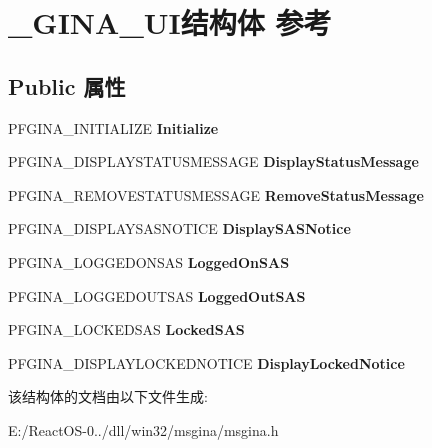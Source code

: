 \hypertarget{struct___g_i_n_a___u_i}{}\section{\+\_\+\+G\+I\+N\+A\+\_\+\+U\+I结构体 参考}
\label{struct___g_i_n_a___u_i}
\subsection*{Public 属性}
\begin{DoxyCompactItemize}
\item 
\mbox{\label{struct___g_i_n_a___u_i_afdce3f71422f5eb54759e1675a76614f}} 
P\+F\+G\+I\+N\+A\+\_\+\+I\+N\+I\+T\+I\+A\+L\+I\+ZE {\bfseries Initialize}
\item 
\mbox{\label{struct___g_i_n_a___u_i_af6692d32eae7412cc06bd110613986ea}} 
P\+F\+G\+I\+N\+A\+\_\+\+D\+I\+S\+P\+L\+A\+Y\+S\+T\+A\+T\+U\+S\+M\+E\+S\+S\+A\+GE {\bfseries Display\+Status\+Message}
\item 
\mbox{\label{struct___g_i_n_a___u_i_ae9ac1347b6acd2fb6b726751b46bf8e6}} 
P\+F\+G\+I\+N\+A\+\_\+\+R\+E\+M\+O\+V\+E\+S\+T\+A\+T\+U\+S\+M\+E\+S\+S\+A\+GE {\bfseries Remove\+Status\+Message}
\item 
\mbox{\label{struct___g_i_n_a___u_i_a6fe8a09b6459a2d148f222a5752d0bf3}} 
P\+F\+G\+I\+N\+A\+\_\+\+D\+I\+S\+P\+L\+A\+Y\+S\+A\+S\+N\+O\+T\+I\+CE {\bfseries Display\+S\+A\+S\+Notice}
\item 
\mbox{\label{struct___g_i_n_a___u_i_ab67f938fa456e3b6f5ff303c073e9271}} 
P\+F\+G\+I\+N\+A\+\_\+\+L\+O\+G\+G\+E\+D\+O\+N\+S\+AS {\bfseries Logged\+On\+S\+AS}
\item 
\mbox{\label{struct___g_i_n_a___u_i_a1315b8d3164c3c27747f07a87c47879d}} 
P\+F\+G\+I\+N\+A\+\_\+\+L\+O\+G\+G\+E\+D\+O\+U\+T\+S\+AS {\bfseries Logged\+Out\+S\+AS}
\item 
\mbox{\label{struct___g_i_n_a___u_i_a50de2812ed44d2c73e79821b88809843}} 
P\+F\+G\+I\+N\+A\+\_\+\+L\+O\+C\+K\+E\+D\+S\+AS {\bfseries Locked\+S\+AS}
\item 
\mbox{\label{struct___g_i_n_a___u_i_a59f944ab7f53bd501af48ab39091baa8}} 
P\+F\+G\+I\+N\+A\+\_\+\+D\+I\+S\+P\+L\+A\+Y\+L\+O\+C\+K\+E\+D\+N\+O\+T\+I\+CE {\bfseries Display\+Locked\+Notice}
\end{DoxyCompactItemize}


该结构体的文档由以下文件生成\+:\begin{DoxyCompactItemize}
\item 
E\+:/\+React\+O\+S-\/0../dll/win32/msgina/msgina.\+h\end{DoxyCompactItemize}
